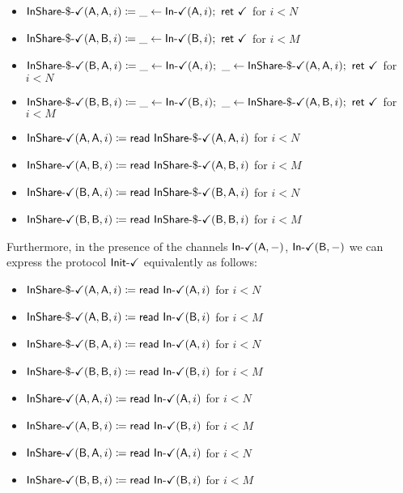 \begin{itemize}
\item {\color{teal} $\InShareGenOk(\A,\A,i) \coloneqq \_ \leftarrow \InOk(\A,i); \ \ret{\checkmark}$ for $i < N$}
\item {\color{teal} $\InShareGenOk(\A,\B,i) \coloneqq \_ \leftarrow \InOk(\B,i); \ \ret{\checkmark}$ for $i < M$}
\item {\color{teal} $\InShareGenOk(\B,\A,i) \coloneqq \_ \leftarrow \InOk(\A,i); \ \_ \leftarrow \InShareGenOk(\A,\A,i); \ \ret{\checkmark}$ for $i < N$}
\item {\color{teal} $\InShareGenOk(\B,\B,i) \coloneqq \_ \leftarrow \InOk(\B,i); \ \_ \leftarrow \InShareGenOk(\A,\B,i); \ \ret{\checkmark}$ for $i < M$}
\item {\color{teal} $\InShareOk(\A,\A,i) \coloneqq \read{\InShareGenOk(\A,\A,i)}$ for $i < N$}
\item {\color{teal} $\InShareOk(\A,\B,i) \coloneqq \read{\InShareGenOk(\A,\B,i)}$ for $i < M$}
\item {\color{teal} $\InShareOk(\B,\A,i) \coloneqq \read{\InShareGenOk(\B,\A,i)}$ for $i < N$}
\item {\color{teal} $\InShareOk(\B,\B,i) \coloneqq \read{\InShareGenOk(\B,\B,i)}$ for $i < M$}
\end{itemize}

\noindent Furthermore, in the presence of the channels $\InOk(\A,-)$, $\InOk(\B,-)$ we can express the protocol $\InitOk$ equivalently as follows:

\begin{itemize}
\item {\color{teal} $\InShareGenOk(\A,\A,i) \coloneqq \read{\InOk(\A,i)}$ for $i < N$}
\item {\color{teal} $\InShareGenOk(\A,\B,i) \coloneqq \read{\InOk(\B,i)}$ for $i < M$}
\item {\color{teal} $\InShareGenOk(\B,\A,i) \coloneqq \read{\InOk(\A,i)}$ for $i < N$}
\item {\color{teal} $\InShareGenOk(\B,\B,i) \coloneqq \read{\InOk(\B,i)}$ for $i < M$}
\item {\color{teal} $\InShareOk(\A,\A,i) \coloneqq \read{\InOk(\A,i)}$ for $i < N$}
\item {\color{teal} $\InShareOk(\A,\B,i) \coloneqq \read{\InOk(\B,i)}$ for $i < M$}
\item {\color{teal} $\InShareOk(\B,\A,i) \coloneqq \read{\InOk(\A,i)}$ for $i < N$}
\item {\color{teal} $\InShareOk(\B,\B,i) \coloneqq \read{\InOk(\B,i)}$ for $i < M$}
\end{itemize}

